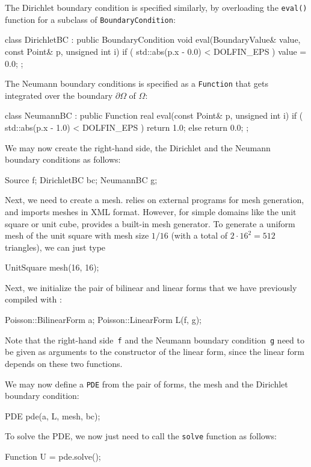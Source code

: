 The Dirichlet boundary condition is specified similarly, by overloading the
\texttt{eval()} function for a subclass of \texttt{BoundaryCondition}:
\small
\begin{code}
class DirichletBC : public BoundaryCondition
{
  void eval(BoundaryValue& value, const Point& p, unsigned int i)
  {
    if ( std::abs(p.x - 0.0) < DOLFIN_EPS )
      value = 0.0;
  }
};
\end{code}
\normalsize
The Neumann boundary conditions is specified as a \texttt{Function}
that gets integrated over the boundary $\partial \Omega$ of $\Omega$:
\begin{code}
class NeumannBC : public Function
{
  real eval(const Point& p, unsigned int i)
  {
    if ( std::abs(p.x - 1.0) < DOLFIN_EPS )
      return 1.0;
    else
      return 0.0;
  }
};
\end{code}
We may now create the right-hand side, the Dirichlet and the Neumann
boundary conditions as follows:
\begin{code}
Source f;
DirichletBC bc;
NeumannBC g;
\end{code}

Next, we need to create a mesh. \dolfin{} relies on
external programs for mesh generation, and imports meshes in \dolfin{}
XML format. However, for simple domains like the unit square or unit
cube, \dolfin{} provides a built-in mesh generator. To generate a
uniform mesh of the unit square with mesh size $1/16$ (with a total of
$2\cdot 16^2 = 512$ triangles), we can just type
\begin{code}
UnitSquare mesh(16, 16);
\end{code}

Next, we initialize the pair of bilinear and linear forms that we have
previously compiled with \ffc{}:
\begin{code}
Poisson::BilinearForm a;
Poisson::LinearForm L(f, g);
\end{code}
Note that the right-hand side~\texttt{f} and the Neumann boundary
condition~\texttt{g} need to be given as arguments to the constructor
of the linear form, since the linear form depends on these two functions.

We may now define a \texttt{PDE} from the pair of forms, the mesh and
the Dirichlet boundary condition:
\begin{code}
PDE pde(a, L, mesh, bc);
\end{code}
To solve the PDE, we now just need to call the \texttt{solve} function
as follows:
\begin{code}
Function U = pde.solve();
\end{code}

